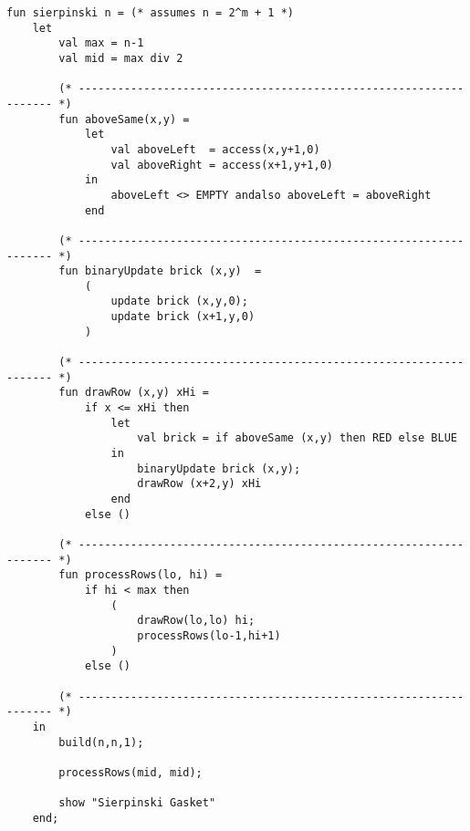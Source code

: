 \documentclass[submission,copyright,creativecommons]{eptcs}
\begin{document}
\begin{lstlisting}
fun sierpinski n = (* assumes n = 2^m + 1 *)
    let
        val max = n-1
        val mid = max div 2

        (* ------------------------------------------------------------------ *)
        fun aboveSame(x,y) =
            let
                val aboveLeft  = access(x,y+1,0)
                val aboveRight = access(x+1,y+1,0)
            in
                aboveLeft <> EMPTY andalso aboveLeft = aboveRight
            end

        (* ------------------------------------------------------------------ *)
        fun binaryUpdate brick (x,y)  =
            (
                update brick (x,y,0);
                update brick (x+1,y,0)
            )

        (* ------------------------------------------------------------------ *)
        fun drawRow (x,y) xHi =
            if x <= xHi then
                let
                    val brick = if aboveSame (x,y) then RED else BLUE
                in
                    binaryUpdate brick (x,y);
                    drawRow (x+2,y) xHi
                end
            else ()

        (* ------------------------------------------------------------------ *)
        fun processRows(lo, hi) =
            if hi < max then
                (
                    drawRow(lo,lo) hi;
                    processRows(lo-1,hi+1)
                )
            else ()

        (* ------------------------------------------------------------------ *)
    in
        build(n,n,1);

        processRows(mid, mid); 

        show "Sierpinski Gasket"
    end;
\end{lstlisting}
\end{document}
